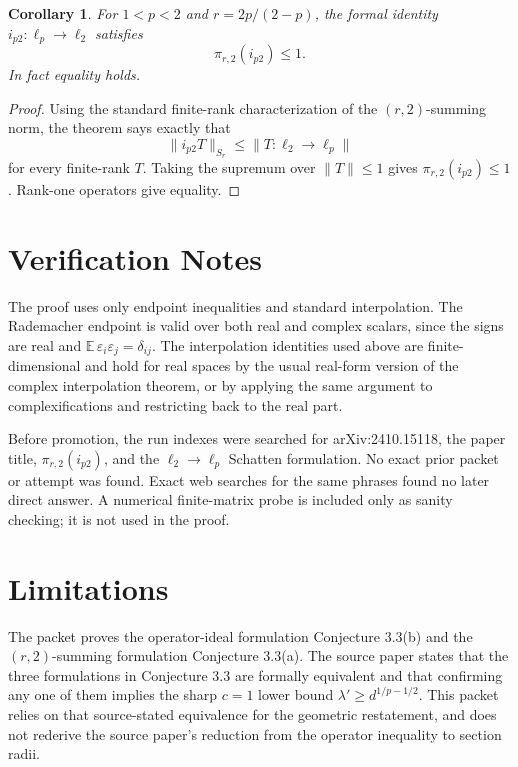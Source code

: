 \documentclass[11pt]{article}
\newtheorem*{corollary}{Corollary}
\begin{document}
\begin{corollary}
For \(1<p<2\) and \(r=2p/(2-p)\), the formal identity
\(i_{p2}:\ell_p\to\ell_2\) satisfies
\[
        \pi_{r,2}(i_{p2})\le 1.
\]
In fact equality holds.
\end{corollary}

\begin{proof}
Using the standard finite-rank characterization of the \((r,2)\)-summing norm,
the theorem says exactly that
\[
        \|i_{p2}T\|_{S_r}\le \|T:\ell_2\to\ell_p\|
\]
for every finite-rank \(T\). Taking the supremum over \(\|T\|\le1\) gives
\(\pi_{r,2}(i_{p2})\le1\). Rank-one operators give equality.
\end{proof}

\section*{Verification Notes}

The proof uses only endpoint inequalities and standard interpolation. The
Rademacher endpoint is valid over both real and complex scalars, since the
signs are real and
\(\mathbb E\,\varepsilon_i\varepsilon_j=\delta_{ij}\). The interpolation
identities used above are finite-dimensional and hold for real spaces by the
usual real-form version of the complex interpolation theorem, or by applying
the same argument to complexifications and restricting back to the real part.

Before promotion, the run indexes were searched for arXiv:2410.15118, the
paper title, \(\pi_{r,2}(i_{p2})\), and the \(\ell_2\to\ell_p\) Schatten
formulation. No exact prior packet or attempt was found. Exact web searches
for the same phrases found no later direct answer. A numerical finite-matrix
probe is included only as sanity checking; it is not used in the proof.

\section*{Limitations}

The packet proves the operator-ideal formulation Conjecture 3.3(b) and the
\((r,2)\)-summing formulation Conjecture 3.3(a). The source paper states that
the three formulations in Conjecture 3.3 are formally equivalent and that
confirming any one of them implies the sharp \(c=1\) lower bound
\(\lambda'\ge d^{1/p-1/2}\). This packet relies on that source-stated
equivalence for the geometric restatement, and does not rederive the
source paper's reduction from the operator inequality to section radii.
\end{document}
